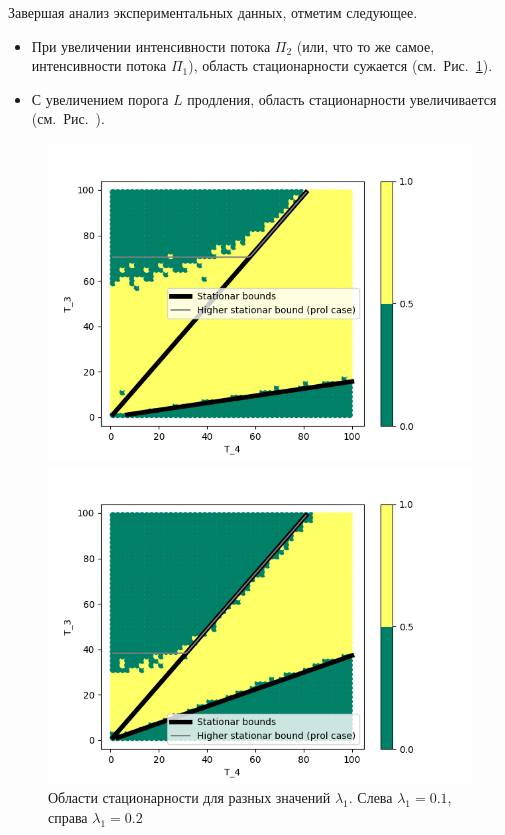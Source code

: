 \documentclass[a4paper,12pt,russian]{extarticle}
\begin{document}
Завершая анализ экспериментальных данных, отметим следующее.
\begin{itemize}
    \item При увеличении интенсивности потока $\Pi_2$ (или, что то же самое, интенсивности потока $\Pi_1$), область стационарности сужается (см.~Рис.~\ref{Experiment:intensities}).
    \item С увеличением порога $L$ продления, область стационарности увеличивается (см.~Рис.~). 
\end{itemize}
\begin{figure}
\begin{multicols}{2}
    \includegraphics[width=1.2\linewidth]{0_1_thres_10_fact.png}\par 
    \includegraphics[width=1.2\linewidth]{0_2_thres_10_fact.png}\par 
    \end{multicols}
\caption{Области стационарности для разных значений $\lambda_1$. Слева $\lambda_1=0.1$, справа $\lambda_1=0.2$}
\label{Experiment:intensities}
\end{figure}
\end{document}
